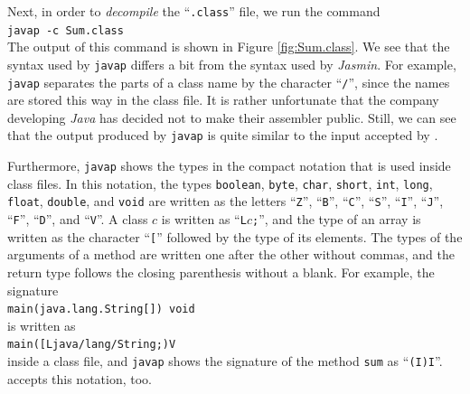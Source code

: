 Next, in order to \emph{decompile} the ``\texttt{.class}'' file, we run the command
\\[0.2cm]
\hspace*{1.3cm}
\texttt{javap -c Sum.class}
\\[0.2cm]
The output of this command is shown in Figure \ref{fig:Sum.class}.  We see that the syntax used by
\texttt{javap} differs a bit from the syntax used by \textsl{Jasmin}.  For example, \texttt{javap} separates the
parts of a class name by the character ``\texttt{/}'', since the names are stored this way in the class file.
It is rather unfortunate that
the company developing \textsl{Java} has decided not to make their assembler public.  Still, we can
see that the output produced by \texttt{javap} is quite similar to the input accepted by .

Furthermore, \texttt{javap} shows the types in the compact notation that is used inside class
files.\label{jvm-descriptors}  In this notation, the types \texttt{boolean}, \texttt{byte}, \texttt{char},
\texttt{short}, \texttt{int}, \texttt{long}, \texttt{float}, \texttt{double}, and \texttt{void} are written as the
letters ``\texttt{Z}'', ``\texttt{B}'', ``\texttt{C}'', ``\texttt{S}'', ``\texttt{I}'', ``\texttt{J}'', ``\texttt{F}'',
``\texttt{D}'', and ``\texttt{V}''.  A class $c$ is written as ``\texttt{L}$c$\texttt{;}'', and the type of an
array is written as the character ``\texttt{[}'' followed by the type of its elements.  The types of the
arguments of a method are written one after the other without commas, and the return type follows the closing
parenthesis without a blank.  For example, the signature
\\[0.2cm]
\hspace*{1.3cm}
\texttt{main(java.lang.String[]) void}
\\[0.2cm]
is written as
\\[0.2cm]
\hspace*{1.3cm}
\texttt{main([Ljava/lang/String;)V}
\\[0.2cm]
inside a class file, and \texttt{javap} shows the signature of the method \texttt{sum} as ``\texttt{(I)I}''.
 accepts this notation, too.

